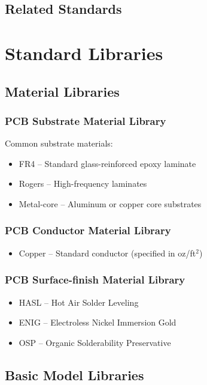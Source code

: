 \documentclass{report}
\begin{document}
\section{Related Standards}




\appendix
\chapter{Standard Libraries}
\section{Material Libraries}
\subsection{PCB Substrate Material Library}
Common substrate materials:
\begin{itemize}
\item FR4 -- Standard glass-reinforced epoxy laminate
\item Rogers -- High-frequency laminates
\item Metal-core -- Aluminum or copper core substrates
\end{itemize}

\subsection{PCB Conductor Material Library}
\begin{itemize}
\item Copper -- Standard conductor (specified in oz/ft$^2$)
\end{itemize}

\subsection{PCB Surface-finish Material Library}
\begin{itemize}
\item HASL -- Hot Air Solder Leveling
\item ENIG -- Electroless Nickel Immersion Gold
\item OSP -- Organic Solderability Preservative
\end{itemize}

\section{Basic Model Libraries}
\end{document}
